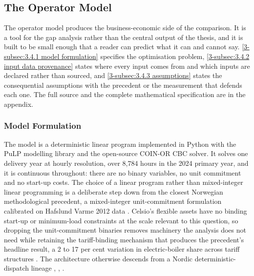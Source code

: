 \subsection{The Operator Model}
\label{3-subsec:3.4 operator model}

The operator model produces the business-economic side of the comparison. It is a tool for the gap analysis rather than the central output of the thesis, and it is built to be small enough that a reader can predict what it can and cannot say. \autoref{3-subsec:3.4.1 model formulation} specifies the optimisation problem, \autoref{3-subsec:3.4.2 input data provenance} states where every input comes from and which inputs are declared rather than sourced, and \autoref{3-subsec:3.4.3 assumptions} states the consequential assumptions with the precedent or the measurement that defends each one. The full source and the complete mathematical specification are in the appendix.

\subsubsection{Model Formulation}
\label{3-subsec:3.4.1 model formulation}

The model is a deterministic linear program implemented in Python with the PuLP modelling library and the open-source COIN-OR CBC solver. It solves one delivery year at hourly resolution, over 8,784 hours in the 2024 primary year, and it is continuous throughout: there are no binary variables, no unit commitment and no start-up costs. The choice of a linear program rather than mixed-integer linear programming is a deliberate step down from the closest Norwegian methodological precedent, a mixed-integer unit-commitment formulation calibrated on Hafslund Varme 2012 data \cite{kirkerud_impacts_2016}. Celsio's flexible assets have no binding start-up or minimum-load constraints at the scale relevant to this question, so dropping the unit-commitment binaries removes machinery the analysis does not need while retaining the tariff-binding mechanism that produces the precedent's headline result, a 2 to 17 per cent variation in electric-boiler share across tariff structures \cite{kirkerud_impacts_2016}. The architecture otherwise descends from a Nordic deterministic-dispatch lineage \cite{kirkerud_impacts_2016}, \cite{johannsen_incentivising_2021}, \cite{tromborg_flexible_2017}.

